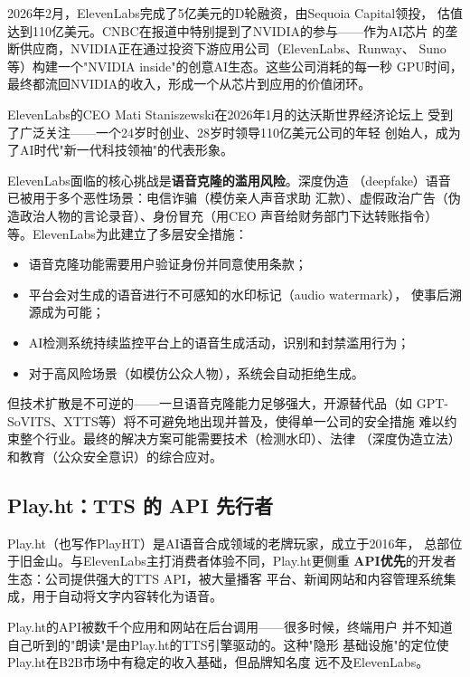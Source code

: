 2026年2月，ElevenLabs完成了5亿美元的D轮融资，由Sequoia Capital领投，
估值达到110亿美元。CNBC在报道中特别提到了NVIDIA的参与——作为AI芯片
的垄断供应商，NVIDIA正在通过投资下游应用公司（ElevenLabs、Runway、
Suno等）构建一个"NVIDIA inside"的创意AI生态。这些公司消耗的每一秒
GPU时间，最终都流回NVIDIA的收入，形成一个从芯片到应用的价值闭环。

ElevenLabs的CEO Mati Staniszewski在2026年1月的达沃斯世界经济论坛上
受到了广泛关注——一个24岁时创业、28岁时领导110亿美元公司的年轻
创始人，成为了AI时代"新一代科技领袖"的代表形象。

ElevenLabs面临的核心挑战是\textbf{语音克隆的滥用风险}。深度伪造
（deepfake）语音已被用于多个恶性场景：电信诈骗（模仿亲人声音求助
汇款）、虚假政治广告（伪造政治人物的言论录音）、身份冒充（用CEO
声音给财务部门下达转账指令）等。ElevenLabs为此建立了多层安全措施：
\begin{itemize}
  \item 语音克隆功能需要用户验证身份并同意使用条款；
  \item 平台会对生成的语音进行不可感知的水印标记（audio watermark），
    使事后溯源成为可能；
  \item AI检测系统持续监控平台上的语音生成活动，识别和封禁滥用行为；
  \item 对于高风险场景（如模仿公众人物），系统会自动拒绝生成。
\end{itemize}

但技术扩散是不可逆的——一旦语音克隆能力足够强大，开源替代品（如
GPT-SoVITS、XTTS等）将不可避免地出现并普及，使得单一公司的安全措施
难以约束整个行业。最终的解决方案可能需要技术（检测水印）、法律
（深度伪造立法）和教育（公众安全意识）的综合应对。

\subsection{Play.ht：TTS 的 API 先行者}
\label{subsec:playht}

Play.ht（也写作PlayHT）是AI语音合成领域的老牌玩家，成立于2016年，
总部位于旧金山。与ElevenLabs主打消费者体验不同，Play.ht更侧重
\textbf{API优先}的开发者生态：公司提供强大的TTS API，被大量播客
平台、新闻网站和内容管理系统集成，用于自动将文字内容转化为语音。

Play.ht的API被数千个应用和网站在后台调用——很多时候，终端用户
并不知道自己听到的"朗读"是由Play.ht的TTS引擎驱动的。这种"隐形
基础设施"的定位使Play.ht在B2B市场中有稳定的收入基础，但品牌知名度
远不及ElevenLabs。


